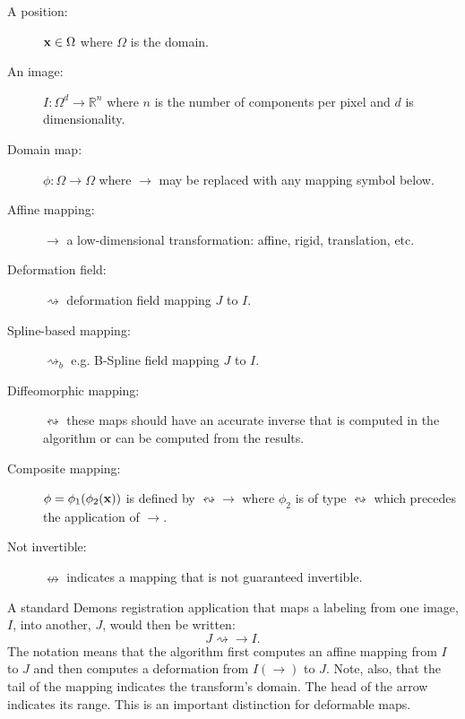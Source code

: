 \documentclass{article}
\begin{document}
\begin{description}
\item [A position:] ${\bf x} \in \Omega$ where $\Omega$ is the domain. 
\item [An image:]  $ I \colon \Omega^d \to \mathbb{R}^n$ where $n$ is the
  number of components per pixel and $d$ is dimensionality.
\item [Domain map:] $ \phi \colon \Omega  \to \Omega $ where $\to$ may be
  replaced with any mapping symbol below. 
\item [Affine mapping:] $\rightarrow$ a low-dimensional
  transformation: affine, rigid, translation, etc. 
\item [Deformation field:] $ \rightsquigarrow$ deformation field mapping $J$
  to $I$.
\item [Spline-based mapping:] $\rightsquigarrow_b$ e.g. B-Spline field mapping $J$
  to $I$.
\item [Diffeomorphic mapping:] $ \leftrightsquigarrow$ these maps
  should have an accurate inverse that is computed in the algorithm or can be computed from the results.
\item [Composite mapping:] $\phi=\phi_1(\phi_2({\bf x}))$ is defined by $\leftrightsquigarrow
  \rightarrow$ where $\phi_2$ is of type $\leftrightsquigarrow$ which precedes the application of $\rightarrow$.
\item[Not invertible:]  $\nleftrightarrow$ indicates a mapping that is
  not guaranteed invertible.
\end{description}
A standard Demons registration application that maps a labeling from
one image, $I$, into another, $J$, would then be written:
$$
J \rightsquigarrow \rightarrow  I .
$$
The notation means that the algorithm first computes an affine mapping
from $I$ to $J$ and then computes a deformation from $I( \rightarrow )$
to $J$.  Note, also, that the tail of the mapping indicates the
transform's domain.  The head of the arrow indicates its range.  This
is an important distinction for deformable maps. 
\end{document}
